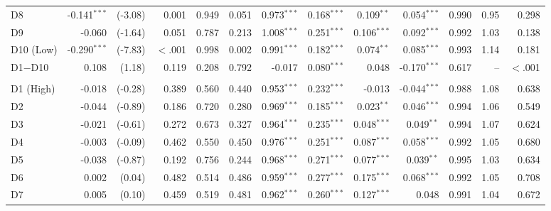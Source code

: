 \begin{table}[!htbp]
{\begin{tabular*}{\linewidth}{@{\extracolsep{\fill}}lrrrrrrrrrrrr}
\hspace{1em}D8 & -0.141$^{***}$ & (-3.08) & 0.001 & 0.949 & 0.051 & 0.973$^{***}$ & 0.168$^{***}$ & 0.109$^{**}$ & 0.054$^{***}$ & 0.990 & 0.95 & 0.298\\
\hspace{1em}D9 & -0.060 & (-1.64) & 0.051 & 0.787 & 0.213 & 1.008$^{***}$ & 0.251$^{***}$ & 0.106$^{***}$ & 0.092$^{***}$ & 0.992 & 1.03 & 0.138\\
\hspace{1em}D10 (Low) & -0.290$^{***}$ & (-7.83) & $<$.001 & 0.998 & 0.002 & 0.991$^{***}$ & 0.182$^{***}$ & 0.074$^{**}$ & 0.085$^{***}$ & 0.993 & 1.14 & 0.181\\
\hspace{1em}D1$-$D10 & 0.108 & (1.18) & 0.119 & 0.208 & 0.792 & -0.017 & 0.080$^{***}$ & 0.048 & -0.170$^{***}$ & 0.617 & -- & $<$.001\\
\addlinespace[0.3em]
\hline
\multicolumn{13}{l}{\textit{Panel E: P3 (from Sep 2010), cohorts 5, 6, 7}}\\
\hspace{1em}D1 (High) & -0.018 & (-0.28) & 0.389 & 0.560 & 0.440 & 0.953$^{***}$ & 0.232$^{***}$ & -0.013 & -0.044$^{***}$ & 0.988 & 1.08 & 0.638\\
\hspace{1em}D2 & -0.044 & (-0.89) & 0.186 & 0.720 & 0.280 & 0.969$^{***}$ & 0.185$^{***}$ & 0.023$^{**}$ & 0.046$^{***}$ & 0.994 & 1.06 & 0.549\\
\hspace{1em}D3 & -0.021 & (-0.61) & 0.272 & 0.673 & 0.327 & 0.964$^{***}$ & 0.235$^{***}$ & 0.048$^{***}$ & 0.049$^{**}$ & 0.994 & 1.07 & 0.624\\
\hspace{1em}D4 & -0.003 & (-0.09) & 0.462 & 0.550 & 0.450 & 0.976$^{***}$ & 0.251$^{***}$ & 0.087$^{***}$ & 0.058$^{***}$ & 0.992 & 1.05 & 0.680\\
\hspace{1em}D5 & -0.038 & (-0.87) & 0.192 & 0.756 & 0.244 & 0.968$^{***}$ & 0.271$^{***}$ & 0.077$^{***}$ & 0.039$^{**}$ & 0.995 & 1.03 & 0.634\\
\hspace{1em}D6 & 0.002 & (0.04) & 0.482 & 0.514 & 0.486 & 0.959$^{***}$ & 0.277$^{***}$ & 0.175$^{***}$ & 0.068$^{***}$ & 0.992 & 1.05 & 0.708\\
\hspace{1em}D7 & 0.005 & (0.10) & 0.459 & 0.519 & 0.481 & 0.962$^{***}$ & 0.260$^{***}$ & 0.127$^{***}$ & 0.048 & 0.991 & 1.04 & 0.672\\

\end{tabular*}}
\end{table}
